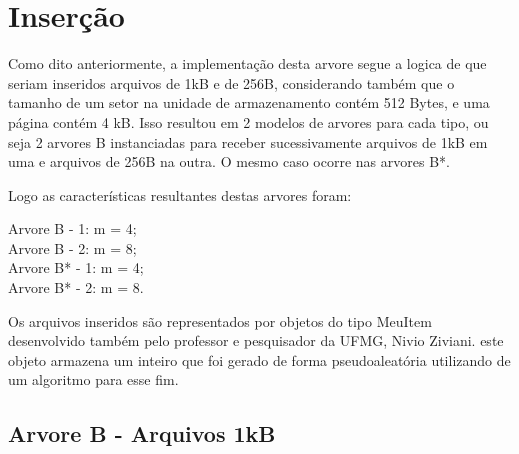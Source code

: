 \label{desenvolvimento}
\section{Inserção}
Como dito anteriormente, a implementação desta arvore segue a logica de que seriam inseridos arquivos de 1kB e de 256B, considerando também que o tamanho de um setor na unidade de armazenamento contém 512 Bytes, e uma página contém 4 kB.
Isso resultou em 2 modelos de arvores para cada tipo, ou seja 2 arvores B instanciadas para receber sucessivamente arquivos de 1kB em uma e arquivos de 256B na outra. O mesmo caso ocorre nas arvores B*.

Logo as características resultantes destas arvores foram:\\
\begin{center}
Arvore B - 1: m = 4;\\
Arvore B - 2: m = 8;\\
Arvore B* - 1: m = 4;\\
Arvore B* - 2: m = 8.
\end{center}

Os arquivos inseridos são representados por objetos do tipo MeuItem desenvolvido também pelo professor e pesquisador da UFMG, Nivio Ziviani. este objeto armazena um inteiro que foi gerado de forma pseudoaleatória utilizando de um algoritmo para esse fim.  


\subsection{Arvore B - Arquivos 1kB}


